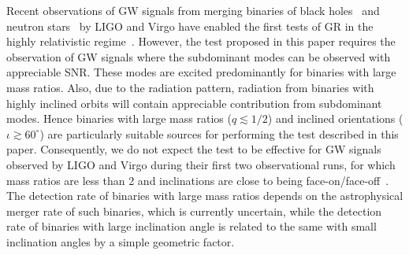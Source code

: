 \documentclass[prl,preprintnumbers,twocolumn,eqsecnum,floatfix,a4paper,nofootinbib,superscriptaddress]{revtex4}
\begin{document}
Recent observations of GW signals from merging binaries of black holes~\cite{gw150914, gw151226, LSC_2016O1results, gw170104, gw170608, gw170814,LIGOScientific:2018mvr} and neutron stars~\cite{gw170817} by LIGO and Virgo have enabled the first tests of GR in the highly relativistic regime~\cite{LSC_2016grtests, LSC_2016O1results, gw170104, gw170608, gw170814}. However, the test proposed in this paper requires the observation of GW signals where the subdominant modes can be observed with appreciable SNR. These modes are excited predominantly for binaries with large mass ratios. Also, due to the radiation pattern, radiation from binaries with highly inclined orbits will contain appreciable contribution from subdominant modes. Hence binaries with large mass ratios ($q \lesssim 1/2$) and inclined orientations ($\iota \gtrsim 60^{\circ}$) are particularly suitable sources for performing the test described in this paper. Consequently, we do not expect the test to be effective for GW signals observed by LIGO and Virgo during their first two observational runs, for which mass ratios are less than 2 and inclinations are close to being face-on/face-off~\cite{LIGOScientific:2018mvr}. The detection rate of binaries with large mass ratios depends on the astrophysical merger rate of such binaries, which is currently uncertain, while the detection rate of binaries with large inclination angle is related to the same with small inclination angles by a simple geometric factor. 
\end{document}
